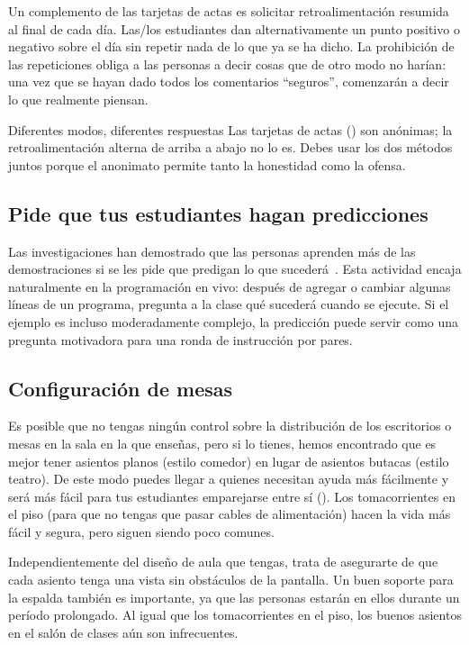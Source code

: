 Un complemento de las tarjetas de actas es solicitar retroalimentación resumida al final de cada día.
Las/los estudiantes dan alternativamente un punto positivo o negativo sobre el día
sin repetir nada de lo que ya se ha dicho.
La prohibición de las repeticiones obliga a las personas a decir cosas que de otro modo no harían:
una vez que se hayan dado todos los comentarios ``seguros'',
comenzarán a decir lo que realmente piensan.

\begin{aside}{Diferentes modos, diferentes respuestas}
  Las tarjetas de actas () son anónimas;
  la retroalimentación alterna de arriba a abajo no lo es.
  Debes usar los dos métodos juntos
  porque el anonimato permite tanto la honestidad como la ofensa.
\end{aside}

\subsection*{Pide que tus estudiantes hagan predicciones}

Las investigaciones han demostrado que las personas aprenden más de las demostraciones
si se les pide que predigan lo que sucederá~\cite{Mill2013}.
Esta actividad encaja naturalmente en la programación en vivo:
después de agregar o cambiar algunas líneas de un programa,
pregunta a la clase qué sucederá cuando se ejecute.
Si el ejemplo es incluso moderadamente complejo,
la predicción puede servir como una pregunta motivadora para una ronda de instrucción por pares.

\subsection*{Configuración de mesas}

Es posible que no tengas ningún control sobre la distribución de los escritorios o mesas
en la sala en la que enseñas,
pero si lo tienes,
hemos encontrado que es mejor tener asientos planos (estilo comedor)
en lugar de asientos butacas (estilo teatro).
De este modo puedes llegar a quienes necesitan ayuda más fácilmente
y será más fácil para tus estudiantes emparejarse entre sí ().
Los tomacorrientes en el piso (para que no tengas que pasar cables de alimentación)
hacen la vida más fácil y segura,
pero siguen siendo poco comunes.

Independientemente del diseño de aula que tengas,
trata de asegurarte de que cada asiento tenga una vista sin obstáculos de la pantalla.
Un buen soporte para la espalda también es importante,
ya que las personas estarán en ellos durante un período prolongado.
Al igual que los tomacorrientes en el piso,
los buenos asientos en el salón de clases aún son infrecuentes.

